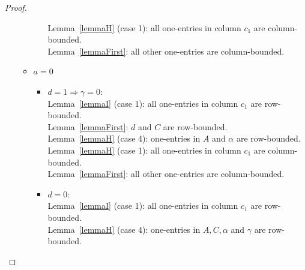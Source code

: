 \begin{proof}
\begin{itemize}
\begin{itemize}
\begin{itemize}
					Lemma~\ref{lemmaH} (case 1): all one-entries in column $c_1$ are column-bounded.\\
					Lemma~\ref{lemmaFirst}: all other one-entries are column-bounded.
			\end{itemize}
		\item $a=0$
			\begin{itemize}
				\item $d=1\Rightarrow\gamma=0$:\\
					Lemma~\ref{lemmaI} (case 1): all one-entries in column $c_1$ are row-bounded.\\
					Lemma~\ref{lemmaFirst}: $d$ and $C$ are row-bounded.\\
					Lemma~\ref{lemmaH} (case 4): one-entries in $A$ and $\alpha$ are row-bounded.\\
					
					Lemma~\ref{lemmaH} (case 1): all one-entries in column $c_1$ are column-bounded.\\
					Lemma~\ref{lemmaFirst}: all other one-entries are column-bounded.
				\item $d=0$:\\
					Lemma~\ref{lemmaI} (case 1): all one-entries in column $c_1$ are row-bounded.\\
					Lemma~\ref{lemmaH} (case 4): one-entries in $A,C,\alpha$ and $\gamma$ are row-bounded.\\
					

\end{itemize}
\end{itemize}
\end{itemize}
\end{proof}
